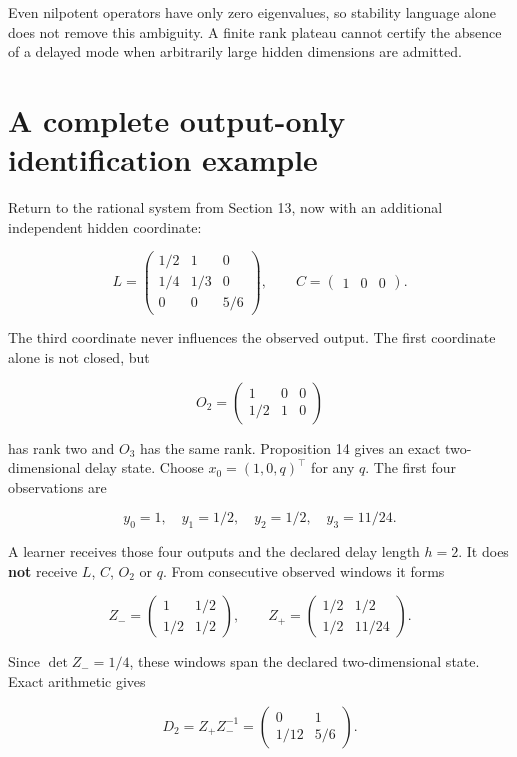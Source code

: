 Even nilpotent operators have only zero eigenvalues, so stability
language alone does not remove this ambiguity. A finite rank plateau
cannot certify the absence of a delayed mode when arbitrarily large
hidden dimensions are admitted.

\section{A complete output-only identification example}\label{LSM:a-complete-output-only-identification-example}

Return to the rational system from Section 13, now with an additional
independent hidden coordinate:

\[
L=\begin{pmatrix}
1/2&1&0\\
1/4&1/3&0\\
0&0&5/6
\end{pmatrix},
\qquad C=\begin{pmatrix}1&0&0\end{pmatrix}.
\]

The third coordinate never influences the observed output. The first
coordinate alone is not closed, but

\[
O_2=\begin{pmatrix}1&0&0\\1/2&1&0\end{pmatrix}
\]

has rank two and \(O_3\) has the same rank. Proposition 14 gives an
exact two-dimensional delay state. Choose \(x_0=(1,0,q)^\top\) for any
\(q\). The first four observations are

\[
y_0=1,\quad y_1=1/2,\quad y_2=1/2,\quad y_3=11/24.
\]

A learner receives those four outputs and the declared delay length
\(h=2\). It does \textbf{not} receive \(L\), \(C\), \(O_2\) or \(q\).
From consecutive observed windows it forms

\[
Z_-=\begin{pmatrix}1&1/2\\1/2&1/2\end{pmatrix},
\qquad
Z_+=\begin{pmatrix}1/2&1/2\\1/2&11/24\end{pmatrix}.
\]

Since \(\det Z_-=1/4\), these windows span the declared two-dimensional
state. Exact arithmetic gives

\[
\boxed{
D_2=Z_+Z_-^{-1}
=\begin{pmatrix}0&1\\1/12&5/6\end{pmatrix}.
}
\]


